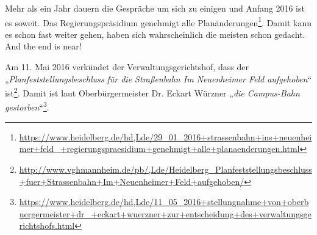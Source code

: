 Mehr als ein Jahr dauern die Gespräche um sich zu einigen und Anfang 2016 ist es soweit. Das Regierungspräsidium genehmigt alle Planänderungen\footnote{\url{https://www.heidelberg.de/hd,Lde/29_01_2016+strassenbahn+ins+neuenheimer+feld_+regierungspraesidium+genehmigt+alle+planaenderungen.html}}. Damit kann es schon fast weiter gehen, haben sich wahrscheinlich die meisten schon gedacht. And the end is near!

Am 11. Mai 2016 verkündet der Verwaltungsgerichtshof, dass der „\textit{Planfeststellungsbeschluss für die Straßenbahn Im Neuenheimer Feld aufgehoben}“ ist\footnote{\url{http://www.vghmannheim.de/pb/,Lde/Heidelberg_Planfeststellungsbeschluss+fuer+Strassenbahn+Im+Neuenheimer+Feld+aufgehoben/}}. Damit ist laut Oberbürgermeister Dr. Eckart Würzner „\textit{die Campus-Bahn gestorben}“\footnote{\url{https://www.heidelberg.de/hd,Lde/11_05_2016+stellungnahme+von+oberbuergermeister+dr_+eckart+wuerzner+zur+entscheidung+des+verwaltungsgerichtshofs.html}}.

\vspace{5em}

\begin{figure}[h]
\end{figure}
